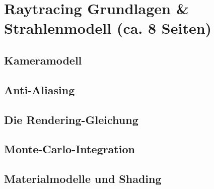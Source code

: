 \section{Raytracing Grundlagen \& Strahlenmodell (ca. 8 Seiten)}

\subsection{Kameramodell}
\subsection{Anti-Aliasing}
\subsection{Die Rendering-Gleichung}
\subsection{Monte-Carlo-Integration}
\subsection{Materialmodelle und Shading}



			

		